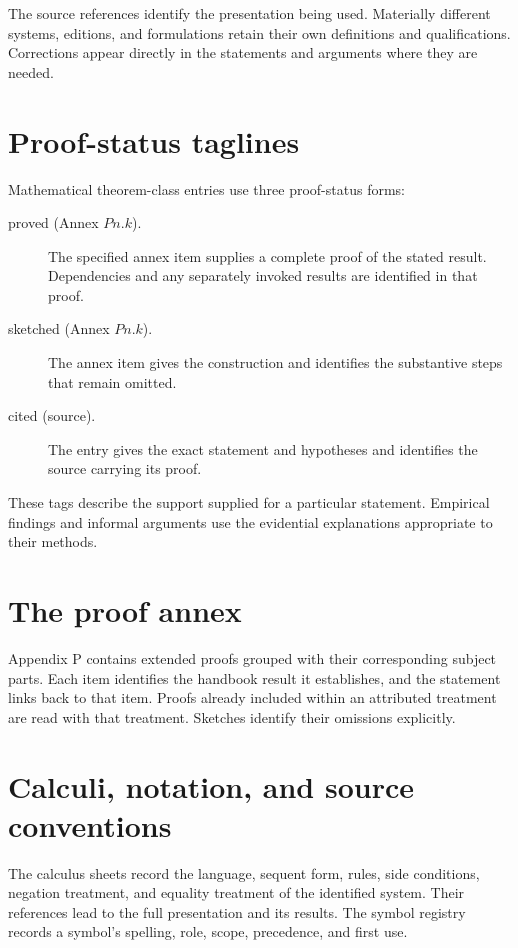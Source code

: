 The source references identify the presentation being used. Materially
different systems, editions, and formulations retain their own definitions
and qualifications. Corrections appear directly in the statements and
arguments where they are needed.

\section*{Proof-status taglines}

Mathematical theorem-class entries use three proof-status forms:
\begin{description}
\item[proved (Annex \(P n.k\)).]
The specified annex item supplies a complete proof of the stated result.
Dependencies and any separately invoked results are identified in that
proof.
\item[sketched (Annex \(P n.k\)).]
The annex item gives the construction and identifies the substantive
steps that remain omitted.
\item[cited (source).]
The entry gives the exact statement and hypotheses and identifies the
source carrying its proof.
\end{description}
These tags describe the support supplied for a particular statement.
Empirical findings and informal arguments use the evidential explanations
appropriate to their methods.

\section*{The proof annex}

Appendix P contains extended proofs grouped with their corresponding
subject parts. Each item identifies the handbook result it establishes,
and the statement links back to that item. Proofs already included within
an attributed treatment are read with that treatment. Sketches identify
their omissions explicitly.

\section*{Calculi, notation, and source conventions}

The calculus sheets record the language, sequent form, rules, side
conditions, negation treatment, and equality treatment of the identified
system. Their references lead to the full presentation and its results.
The symbol registry records a symbol's spelling, role, scope, precedence,
and first use.

